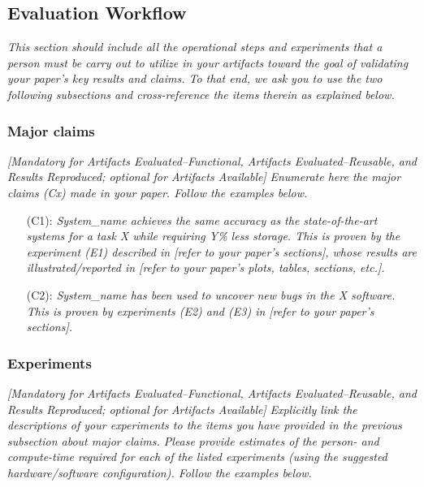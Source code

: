 \documentclass[sigconf]{acmart}
\begin{document}
\subsection{Evaluation Workflow}

\emph{This section should include all the operational steps and
experiments that a person must be carry out to utilize in your
artifacts toward the goal of validating your paper's key results and
claims.  To that end, we ask you to use the two following subsections
and cross-reference the items therein as explained below.}


\subsubsection{Major claims}

\emph{[Mandatory for \emph{Artifacts Evaluated--Functional},
  \emph{Artifacts Evaluated--Reusable}, and \emph{Results Reproduced};
  optional for \emph{Artifacts Available}]}
%
\emph{Enumerate here the major claims (Cx) made in your paper.  Follow
the examples below.}
\bigskip

\begin{itemize}
\item[(C1):]
  \emph{System\_name achieves the same accuracy as the
  state-of-the-art systems for a task X while requiring Y\% less
  storage.  This is proven by the experiment (E1) described in [refer
    to your paper's sections], whose results are illustrated/reported
  in [refer to your paper's plots, tables, sections, etc.].}

\item[(C2):]
  \emph{System\_name has been used to uncover new bugs in the X
  software.  This is proven by experiments (E2) and (E3) in [refer to
    your paper's sections].}
\end{itemize}


\subsubsection{Experiments}

\emph{[Mandatory for \emph{Artifacts Evaluated--Functional},
  \emph{Artifacts Evaluated--Reusable}, and \emph{Results Reproduced};
  optional for \emph{Artifacts Available}]}
%
\emph{Explicitly link the descriptions of your experiments to the
items you have provided in the previous subsection about major claims.
Please provide estimates of the person- and compute-time required for
each of the listed experiments (using the suggested hardware/software
configuration).  Follow the examples below.}
\end{document}
